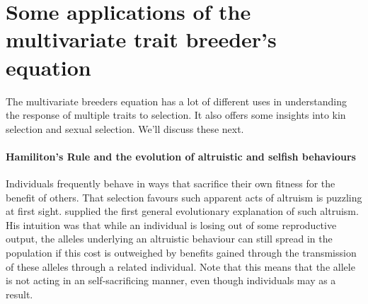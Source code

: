 \section{Some applications of the multivariate trait breeder's equation}

The multivariate breeders equation has a lot of different uses in understanding the response of multiple traits to selection. It also offers some insights into kin selection and sexual selection. We'll discuss these next.

\paragraph{Hamiliton's Rule and the evolution of altruistic and selfish behaviours}
Individuals frequently behave in ways that sacrifice their own fitness for the
benefit of others. That selection favours such apparent acts of altruism is puzzling at first sight. \citet{hamilton1964genetical,hamilton1964genetical2} supplied the first general evolutionary explanation of such altruism. 
His intuition was that while an individual is losing out of some reproductive output, the alleles underlying an altruistic behaviour can still spread in the population if this cost is outweighed by benefits gained 
through the transmission of these alleles through a related individual. Note that this means that the
allele is not acting in an self-sacrificing manner, even though individuals may as a result. 
